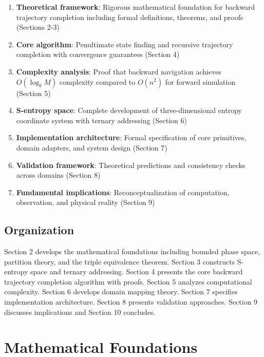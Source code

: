 \documentclass[twocolumn,10pt]{article}
\begin{document}
\begin{enumerate}
\item \textbf{Theoretical framework}: Rigorous mathematical foundation for backward trajectory completion including formal definitions, theorems, and proofs (Sections 2-3)

\item \textbf{Core algorithm}: Penultimate state finding and recursive trajectory completion with convergence guarantees (Section 4)

\item \textbf{Complexity analysis}: Proof that backward navigation achieves $O(\log_b M)$ complexity compared to $O(n^2)$ for forward simulation (Section 5)

\item \textbf{S-entropy space}: Complete development of three-dimensional entropy coordinate system with ternary addressing (Section 6)

\item \textbf{Implementation architecture}: Formal specification of core primitives, domain adapters, and system design (Section 7)

\item \textbf{Validation framework}: Theoretical predictions and consistency checks across domains (Section 8)

\item \textbf{Fundamental implications}: Reconceptualization of computation, observation, and physical reality (Section 9)
\end{enumerate}

\subsection{Organization}

Section 2 develops the mathematical foundations including bounded phase space, partition theory, and the triple equivalence theorem. Section 3 constructs S-entropy space and ternary addressing. Section 4 presents the core backward trajectory completion algorithm with proofs. Section 5 analyzes computational complexity. Section 6 develops domain mapping theory. Section 7 specifies implementation architecture. Section 8 presents validation approaches. Section 9 discusses implications and Section 10 concludes.

\section{Mathematical Foundations}
\end{document}
